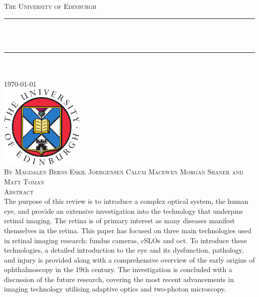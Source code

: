 \documentclass[11pt, a4paper, oneside]{Thesis}
\title{\ttitle}
\begin{document}
\frontmatter %
\fancyhead{} %
\rhead{\thepage} %
\lhead{} %
\pagestyle{fancy}
\newcommand{\HRule}{\rule{\linewidth}{0.5mm}} %




\begin{titlepage}
\begin{center}

\textsc{\LARGE The University of Edinburgh}\\[1.5cm]
\HRule \\[0.8cm] %

\textsc{\huge \ttitle }\\[0.2cm]
\HRule \\[0.5cm] %
\textsc{\Large \deptname}\\[1.0cm]

\large \today \\[1cm]

\includegraphics[width=4.0cm]{logo}\\[1cm]

\textsc{\small By Magdalen Berns Eskil Joergensen Calum Macewen Morgan Shaner and Matt Toman} \\[1cm]

\textsc{\Large{Abstract}}\\

The purpose of this review is to introduce a complex optical system, 
the human eye, and provide an extensive investigation into the technology 
that underpins retinal imaging.  The retina is of primary interest as many 
diseases manifest themselves in the retina. This paper has focused on 
three main technologies used in retinal imaging research: fundus cameras, 
cSLOs and \Gls{oct}. To introduce these technologies, a detailed 
introduction to the eye and its dysfunction, pathology, and injury is provided 
along with a comprehensive overview of the early origins of ophthalmoscopy 
in the 19th century. The investigation is concluded with a discussion of the 
future research, covering the most recent advancements in imaging 
technology utilising adaptive optics and two-photon microscopy.  

\end{center}

\end{titlepage}
\end{document}
